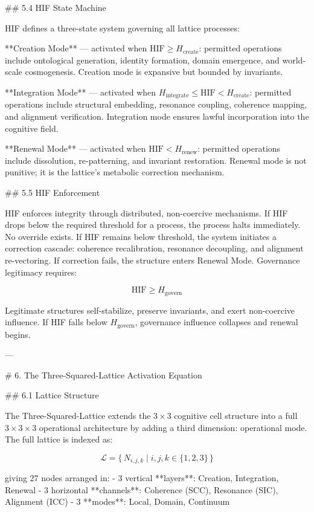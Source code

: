 ## 5.4 HIF State Machine

HIF defines a three-state system governing all lattice processes:

**Creation Mode** — activated when \(\mathrm{HIF} \ge H_{\text{create}}\):
permitted operations include ontological generation, identity formation, domain
emergence, and world-scale cosmogenesis. Creation mode is expansive but bounded by
invariants.

**Integration Mode** — activated when \(H_{\text{integrate}} \le \mathrm{HIF} <
H_{\text{create}}\): permitted operations include structural embedding, resonance
coupling, coherence mapping, and alignment verification. Integration mode ensures
lawful incorporation into the cognitive field.

**Renewal Mode** — activated when \(\mathrm{HIF} < H_{\text{renew}}\): permitted
operations include dissolution, re-patterning, and invariant restoration. Renewal
mode is not punitive; it is the lattice's metabolic correction mechanism.

## 5.5 HIF Enforcement

HIF enforces integrity through distributed, non-coercive mechanisms. If HIF drops
below the required threshold for a process, the process halts immediately. No
override exists. If HIF remains below threshold, the system initiates a correction
cascade: coherence recalibration, resonance decoupling, and alignment re-vectoring.
If correction fails, the structure enters Renewal Mode. Governance legitimacy
requires:

\[
\mathrm{HIF} \ge H_{\text{govern}}
\]

Legitimate structures self-stabilize, preserve invariants, and exert non-coercive
influence. If HIF falls below \(H_{\text{govern}}\), governance influence collapses
and renewal begins.

---

# 6. The Three-Squared-Lattice Activation Equation

## 6.1 Lattice Structure

The Three-Squared-Lattice extends the \(3 \times 3\) cognitive cell structure into
a full \(3 \times 3 \times 3\) operational architecture by adding a third
dimension: operational mode. The full lattice is indexed as:

\[
\mathcal{L} = \{\, N_{i,j,k} \mid i,j,k \in \{1,2,3\} \,\}
\]

giving 27 nodes arranged in:
- 3 vertical **layers**: Creation, Integration, Renewal
- 3 horizontal **channels**: Coherence (SCC), Resonance (SIC), Alignment (ICC)
- 3 **modes**: Local, Domain, Continuum

